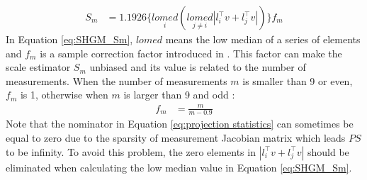 \begin{align}
    S_m &= 1.1926\{\underset{i}{lomed} (\underset{j \neq i}{lomed}| l_{i}^{\intercal}v + l_{j}^{\intercal}v|)\}f_m
    \label{eq:SHGM_Sm}
\end{align}
In Equation \ref{eq:SHGM_Sm}, $lomed$ means the low median of a series of elements and $f_m$ is a sample correction factor introduced in \cite{croux1992time}. This factor can make the scale estimator $S_m$ unbiased and its value is related to the number of measurements. When the number of measurements $m$ is smaller than 9 or even, $f_m$ is 1, otherwise when $m$ is larger than 9 and odd \cite{rousseeuw1993alternatives}:
\begin{align}
    f_m &= \frac{m}{m-0.9}
    \label{eq:SHGM fm}
\end{align}
Note that the nominator in Equation \ref{eq:projection statistics} can sometimes be equal to zero due to the sparsity of measurement Jacobian matrix which leads $PS$ to be infinity. To avoid this problem, the zero elements in $| l_{i}^{\intercal}v + l_{j}^{\intercal}v|$ should be eliminated when calculating the low median value in Equation \ref{eq:SHGM_Sm}.

